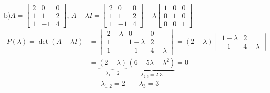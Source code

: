 \documentclass[11pt,a4paper]{article}
\begin{document}
b)\quad $A=\begin{bmatrix}2&0&0\\1&1&2\\1&-1&4\end{bmatrix}$, \quad
$A-\lambda I=\begin{bmatrix}2&0&0\\1&1&2\\1&-1&4\end{bmatrix}-\lambda\begin{bmatrix}1&0&0\\0&1&0\\0&0&1\end{bmatrix}$
\begin{align*}
  P(\lambda)=\det(A-\lambda I)
  &=\begin{vmatrix}2-\lambda&0&0\\1&1-\lambda&2\\1&-1&4-\lambda\end{vmatrix}
   =(2-\lambda)\begin{vmatrix}1-\lambda&2\\-1&4-\lambda\end{vmatrix}\\
  &=\underbrace{(2-\lambda)}_{\lambda_1=2}\,\underbrace{(6-5\lambda+\lambda^2)}_{\lambda_{2,3}=2,3}=0
\end{align*}
\[ \lambda_{1,2}=2 \qquad \lambda_3=3 \]
\end{document}
